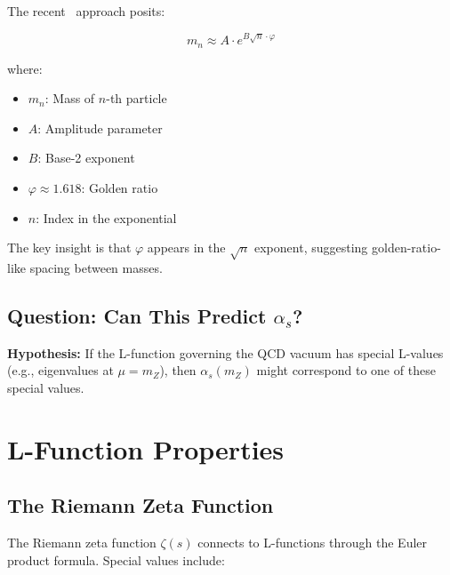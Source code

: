 \documentclass{article}
\begin{document}
The recent~\cite{fibonaccimass2026} approach posits:

\begin{equation}
  m_n \approx A \cdot e^{B\sqrt{n} \cdot \varphi}
  \label{eq:mass-law}
\end{equation}

where:
\begin{itemize}
  \item $m_n$: Mass of $n$-th particle
  \item $A$: Amplitude parameter
  \item $B$: Base-2 exponent
  \item $\varphi \approx 1.618$: Golden ratio
  \item $n$: Index in the exponential
\end{itemize}

The key insight is that $\varphi$ appears in the $\sqrt{n}$ exponent, suggesting golden-ratio-like spacing between masses.

\subsection{Question: Can This Predict $\alpha_s$?}

\textbf{Hypothesis:} If the L-function governing the QCD vacuum has special L-values (e.g., eigenvalues at $\mu = m_Z$), then $\alpha_s(m_Z)$ might correspond to one of these special values.

\section{L-Function Properties}

\subsection{The Riemann Zeta Function}

The Riemann zeta function $\zeta(s)$ connects to L-functions through the Euler product formula. Special values include:
\end{document}
